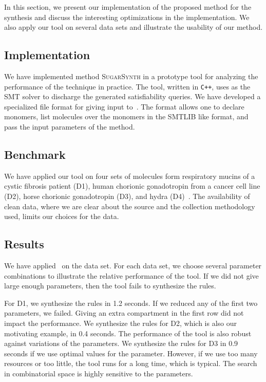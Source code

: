 In this section, we  present our implementation of the proposed method for the synthesis
and discuss the interesting optimizations in the implementation.
%
We also apply our tool on several data sets and illustrate the usability of our method.

\subsection{Implementation} 
We have implemented method \textsc{SugarSynth} in a prototype tool {\ourtool} for
analyzing the performance of the technique in practice.
%
The tool, written in {\tt C++}, uses {\zthree}\cite{z3} as the SMT solver
to discharge the generated satisfiability queries.
%
We have developed a specialized file format for giving input to~\ourtool.
%
The format allows one to declare monomers, list molecules over the monomers
in the SMTLIB like format,
and pass the input parameters of the method.




\subsection{Benchmark}

We have applied our tool on four sets of molecules form
respiratory mucins of a cystic fibrosis patient (D1),
human chorionic gonadotropin from a cancer cell line (D2), horse chorionic gonadotropin (D3), and
hydra (D4)~\cite{Jaiman2018,hydra}.
The availability of clean data, where we are clear about the source and the collection
methodology used, limits our choices for the data.

\subsection{Results}


We have applied \ourtool~on the data set. For each data set, we choose several
parameter combinations to illustrate the relative performance of the tool.
If we did not give large enough parameters, then the tool fails to synthesize the rules.

For D1, we synthesize the rules in 1.2 seconds. If we reduced any of the first
two parameters, we failed.
Giving an extra compartment in the first row did not impact the performance.
We synthesize the rules for D2, which is also our motivating example, in 0.4 seconds.
The performance of the tool is also robust against variations of the parameters.
We synthesize the rules for D3 in 0.9 seconds if we use optimal values for the parameter.
However, if we use too many resources or too little, the tool runs for a long time,
which is typical. The search in combinatorial space is highly sensitive to the parameters.

